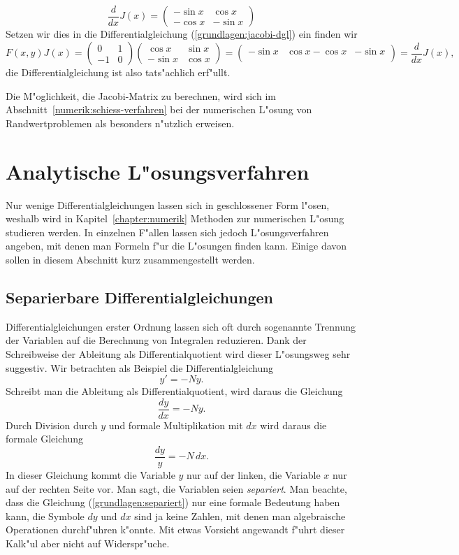\begin{beispiel}
\[
\frac{d}{dx}J(x)
=
\begin{pmatrix}
-\sin x& \cos x\\
-\cos x&-\sin x
\end{pmatrix}
\]
Setzen wir dies in die Differentialgleichung (\ref{grundlagen:jacobi-dgl}) ein
finden wir
\[
F(x,y)J(x)
=
\begin{pmatrix}
 0&1\\
-1&0
\end{pmatrix}
\begin{pmatrix}
 \cos x&\sin x\\
-\sin x&\cos x
\end{pmatrix}
=
\begin{pmatrix}
-\sin x& \cos x
-\cos x&-\sin x\\
\end{pmatrix}
=
\frac{d}{dx}J(x),
\]
die Differentialgleichung ist also tats"achlich erf"ullt.
\end{beispiel}
Die M"oglichkeit, die Jacobi-Matrix zu berechnen, wird sich im
Abschnitt~\ref{numerik:schiess-verfahren} bei der numerischen
L"osung von Randwertproblemen als besonders n"utzlich erweisen.

\section{Analytische L"osungsverfahren\label{section:analytischeverfahren}}
Nur wenige Differentialgleichungen lassen sich in geschlossener Form
l"osen, weshalb wird in Kapitel~\ref{chapter:numerik} Methoden zur
numerischen L"osung studieren werden.
In einzelnen F"allen lassen sich jedoch L"osungsverfahren angeben,
mit denen man Formeln f"ur die L"osungen finden kann.
Einige davon sollen in diesem Abschnitt kurz zusammengestellt werden.

\subsection{Separierbare Differentialgleichungen}
Differentialgleichungen erster Ordnung lassen sich oft durch sogenannte
Trennung der Variablen auf die Berechnung von Integralen reduzieren.
Dank der Schreibweise der Ableitung als Differentialquotient wird
dieser L"osungsweg sehr suggestiv.
Wir betrachten als Beispiel die Differentialgleichung
\[
y'=-Ny.
\]
Schreibt man die Ableitung als Differentialquotient, wird daraus die
Gleichung
\[
\frac{dy}{dx}=-Ny.
\]
Durch Division durch $y$ und formale Multiplikation mit $dx$ wird daraus
die formale Gleichung
\begin{equation}
\frac{dy}{y}=-N\,dx.
\label{grundlagen:separiert}
\end{equation}
In dieser Gleichung kommt die Variable $y$ nur auf der linken, die Variable
$x$ nur auf der rechten Seite vor.
Man sagt, die Variablen seien {\em separiert}.
Man beachte, dass die Gleichung (\ref{grundlagen:separiert}) nur eine
formale Bedeutung haben kann, die Symbole $dy$ und $dx$ sind ja keine Zahlen,
mit denen man algebraische Operationen durchf"uhren k"onnte.
Mit etwas Vorsicht angewandt f"uhrt dieser Kalk"ul aber nicht auf
Widerspr"uche.

